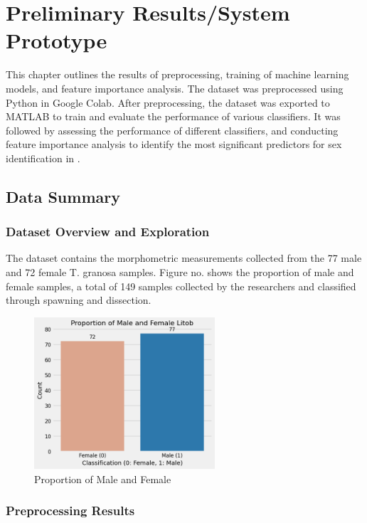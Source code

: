 
\chapter{Preliminary Results/System Prototype}
This chapter outlines the results of preprocessing, training of machine learning models, and feature importance analysis. The dataset was preprocessed using Python in Google Colab. After preprocessing, the dataset was exported to MATLAB to train and evaluate the performance of various classifiers. It was followed by assessing the performance of different classifiers, and conducting feature importance analysis to identify the most significant predictors for sex identification in \Tgranosa.

\section{Data Summary}
\subsection{Dataset Overview and Exploration}

The dataset contains the morphometric measurements collected from the 77 male and 72 female T. granosa samples. Figure no. shows the proportion of male and female samples, a total of 149 samples collected by the researchers and classified through spawning and dissection. 

\begin{figure}[!htbp]
	\centering
	\includegraphics[width=0.6\textwidth]{figures/test-train.png}
	\caption{Proportion of Male and Female \Tgranosa}
	\label{fig:test-train}
\end{figure}

\subsection{Preprocessing Results}

